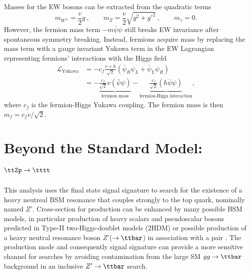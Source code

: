 \documentclass[../thesis.tex]{subfiles}
\begin{document}
Masses for the \acs{EW} bosons can be extracted from the quadratic terms
\begin{equation}
m_{W^\pm} = \frac{v}{2}g\:, \qquad m_Z = \frac{v}{2}\sqrt{g^2+g'^2}\:, \qquad m_\gamma = 0.
\end{equation}
However, the fermion mass term $-m\bar{\psi}\psi$ still breaks \acs{EW} invariance after spontaneous symmetry breaking. Instead, fermions acquire mass by replacing the mass term with a gauge invariant Yukawa term in the \acs{EW} Lagrangian representing fermions' interactions with the Higgs field \citep{theory:higgs_physics}
\begin{equation}
\begin{aligned}
\mathcal{L}_\text{Yukawa} 
&= -c_f\frac{v+h}{\sqrt{2}}\left(\bar{\psi}_R\psi_L+\bar{\psi}_L\psi_R\right) \\
&=
- \underbrace{\frac{c_f}{\sqrt{2}}v(\bar{\psi}\psi)}_\text{fermion mass}
- \underbrace{\frac{c_f}{\sqrt{2}}(h\bar{\psi}\psi)}_\text{fermion-Higgs interaction},
\end{aligned}
\end{equation}
where $c_f$ is the fermion-Higgs Yukawa coupling. The fermion mass is then $m_f = c_f v/\sqrt{2}$.

\section{Beyond the Standard Model: $\ttZp\rightarrow\tttt$}

This analysis uses the \tttt final state signal signature to search for the existence of a heavy neutreal \acs{BSM} resonance that couples strongly to the top quark, nominally named $Z'$. Cross-section for \tttt production can be enhanced by many possible \acs{BSM} models, in particular production of heavy scalars and pseudoscalar bosons predicted in Type-II two-Higgs-doublet models (\acs{2HDM}) \citep{Craig:2015jba,Craig_2017,Branco:2011iw,PhysRevD.93.075038,higgscomp} or possible production of a heavy neutral resonance boson $Z'$($\rightarrow\ttbar$) in association with a \ttbar pair \citep{Ferretti:2013kya,Vecchi:2015fma}. The \ttZp production mode and consequently \tttt signal signature can provide a more sensitive channel for searches by avoiding contamination from the large \acs{SM} $gg\rightarrow \ttbar$ background in an inclusive $Z'\rightarrow\ttbar$ search.
\end{document}
